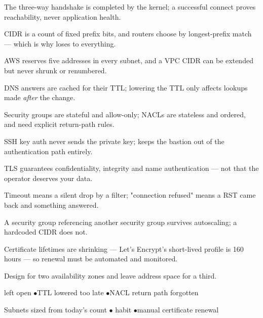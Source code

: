 \begin{tickcheck}
  \item The three-way handshake is completed by the kernel; a successful connect proves reachability, never application health.
  \item CIDR is a count of fixed prefix bits, and routers choose by longest-prefix match --- which is why  loses to everything.
  \item AWS reserves five addresses in every subnet, and a VPC CIDR can be extended but never shrunk or renumbered.
  \item DNS answers are cached for their TTL; lowering the TTL only affects lookups made \emph{after} the change.
  \item Security groups are stateful and allow-only; NACLs are stateless and ordered, and need explicit return-path rules.
  \item SSH key auth never sends the private key;  keeps the bastion out of the authentication path entirely.
  \item TLS guarantees confidentiality, integrity and name authentication --- not that the operator deserves your data.
\end{tickcheck}

\begin{wbitem}
  \item Timeout means a silent drop by a filter; "connection refused" means a RST came back and something answered.
  \item A security group referencing another security group survives autoscaling; a hardcoded CIDR does not.
  \item Certificate lifetimes are shrinking --- Let's Encrypt's short-lived profile is 160 hours --- so renewal must be automated and monitored.
  \item Design for two availability zones and leave address space for a third.
\end{wbitem}

\begin{wbitem}
  \item {} left open \quad$\bullet$\quad TTL lowered too late \quad$\bullet$\quad NACL return path forgotten
  \item Subnets sized from today's count \quad$\bullet$\quad {} habit \quad$\bullet$\quad manual certificate renewal
\end{wbitem}

